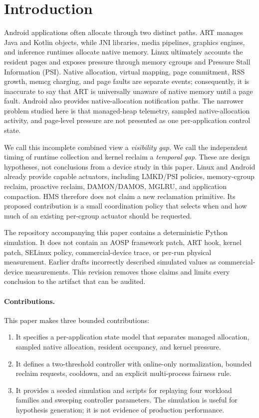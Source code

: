 \section{Introduction}
Android applications often allocate through two distinct paths.  ART manages Java
and Kotlin objects, while JNI libraries, media pipelines, graphics engines, and
inference runtimes allocate native memory.  Linux ultimately accounts the resident
pages and exposes pressure through memory cgroups and Pressure Stall Information
(PSI).  Native allocation, virtual mapping, page commitment, RSS growth, memcg
charging, and page faults are separate events; consequently, it is inaccurate to
say that ART is universally unaware of native memory until a page fault.  Android
also provides native-allocation notification paths.  The narrower problem studied
here is that managed-heap telemetry, sampled native-allocation activity, and
page-level pressure are not presented as one per-application control state.

We call this incomplete combined view a \emph{visibility gap}.  We call the
independent timing of runtime collection and kernel reclaim a \emph{temporal gap}.
These are design hypotheses, not conclusions from a device study in this paper.
Linux and Android already provide capable actuators, including LMKD/PSI policies,
memory-cgroup reclaim, proactive reclaim, DAMON/DAMOS, MGLRU, and application
compaction.  HMS therefore does not claim a new reclamation primitive.  Its proposed
contribution is a small coordination policy that selects when and how much of an
existing per-cgroup actuator should be requested.

The repository accompanying this paper contains a deterministic Python simulation.
It does not contain an AOSP framework patch, ART hook, kernel patch, SELinux policy,
commercial-device trace, or per-run physical measurement.  Earlier drafts
incorrectly described simulated values as commercial-device measurements.  This
revision removes those claims and limits every conclusion to the artifact that can
be audited.

\paragraph{Contributions.}
This paper makes three bounded contributions:
\begin{enumerate}
  \item It specifies a per-application state model that separates managed
  allocation, sampled native allocation, resident occupancy, and kernel pressure.
  \item It defines a two-threshold controller with online-only normalization,
  bounded reclaim requests, cooldown, and an explicit multi-process fairness rule.
  \item It provides a seeded simulation and scripts for replaying four workload
  families and sweeping controller parameters.  The simulation is useful for
  hypothesis generation; it is not evidence of production performance.
\end{enumerate}
